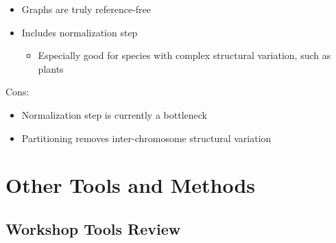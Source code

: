 \documentclass[
]{book}
\providecommand{\tightlist}{%
  \setlength{\itemsep}{0pt}\setlength{\parskip}{0pt}}
\begin{document}
\begin{itemize}
\tightlist
\item
  Graphs are truly reference-free
\item
  Includes normalization step

  \begin{itemize}
  \tightlist
  \item
    Especially good for species with complex structural variation, such as plants
  \end{itemize}
\end{itemize}

Cons:

\begin{itemize}
\tightlist
\item
  Normalization step is currently a bottleneck
\item
  Partitioning removes inter-chromosome structural variation
\end{itemize}

\hypertarget{other-tools-and-methods}{%
\chapter{Other Tools and Methods}\label{other-tools-and-methods}}

\hypertarget{workshop-tools-review}{%
\section{Workshop Tools Review}\label{workshop-tools-review}}
\end{document}
